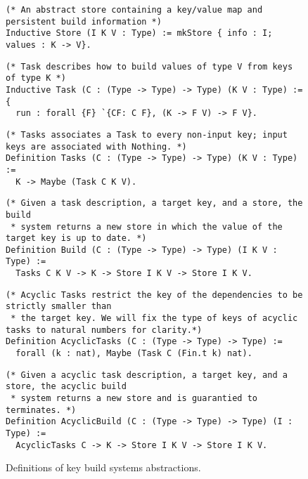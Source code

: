 \documentclass[sigplan,review]{acmart}\settopmatter{printfolios=true,printccs=false,printacmref=false}
\begin{document}
\begin{figure*}[t]
\begin{verbatim}
(* An abstract store containing a key/value map and persistent build information *)
Inductive Store (I K V : Type) := mkStore { info : I; values : K -> V}.
\end{verbatim}
\vspace{-1mm}
\begin{verbatim}
(* Task describes how to build values of type V from keys of type K *)
Inductive Task (C : (Type -> Type) -> Type) (K V : Type) := {
  run : forall {F} `{CF: C F}, (K -> F V) -> F V}.
\end{verbatim}
\vspace{-1mm}
\begin{verbatim}
(* Tasks associates a Task to every non-input key; input keys are associated with Nothing. *)
Definition Tasks (C : (Type -> Type) -> Type) (K V : Type) :=
  K -> Maybe (Task C K V).
\end{verbatim}
\vspace{-1mm}
\begin{verbatim}
(* Given a task description, a target key, and a store, the build
 * system returns a new store in which the value of the target key is up to date. *)
Definition Build (C : (Type -> Type) -> Type) (I K V : Type) :=
  Tasks C K V -> K -> Store I K V -> Store I K V.
\end{verbatim}
\vspace{-1mm}
\begin{verbatim}
(* Acyclic Tasks restrict the key of the dependencies to be strictly smaller than
 * the target key. We will fix the type of keys of acyclic tasks to natural numbers for clarity.*)
Definition AcyclicTasks (C : (Type -> Type) -> Type) :=
  forall (k : nat), Maybe (Task C (Fin.t k) nat).
\end{verbatim}
\vspace{-1mm}
\begin{verbatim}
(* Given a acyclic task description, a target key, and a store, the acyclic build
 * system returns a new store and is guarantied to terminates. *)
Definition AcyclicBuild (C : (Type -> Type) -> Type) (I : Type) :=
  AcyclicTasks C -> K -> Store I K V -> Store I K V.
\end{verbatim}
\vspace{-3mm}
\caption{Definitions of key build systems abstractions.}\label{fig-defs}
\vspace{-5mm}
\end{figure*}
\end{document}
